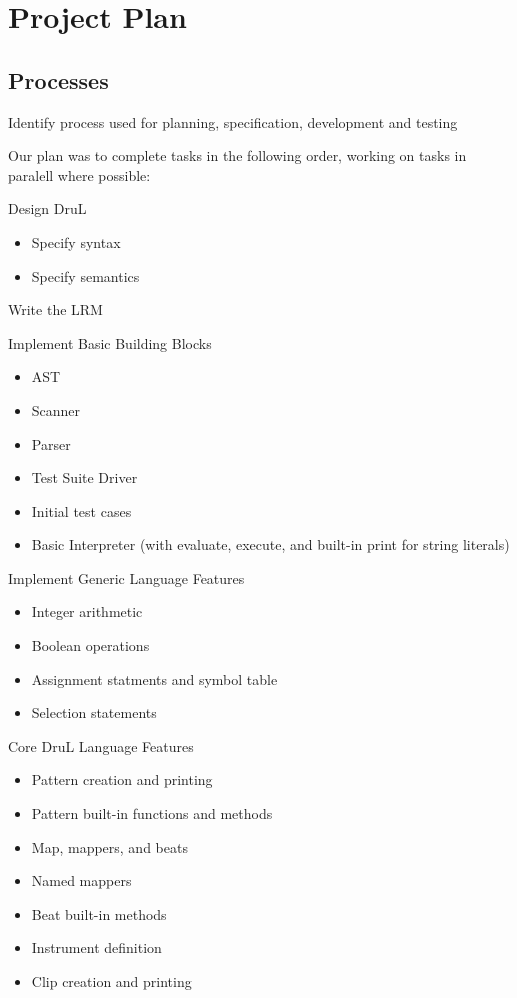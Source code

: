 \chapter{Project Plan}

\section{Processes}
Identify process used for planning, specification, development and testing

Our plan was to complete tasks in the following order, working on tasks in paralell where possible:

\begin{enumeration}

\item Design DruL
\begin{itemize}
	\item Specify syntax
	\item Specify semantics
\end{itemize}

\item Write the LRM

\item Implement Basic Building Blocks
\begin{itemize}
	\item AST
	\item Scanner
	\item Parser
	\item Test Suite Driver
	\item Initial test cases
	\item Basic Interpreter (with evaluate, execute, and built-in print for string literals)
\end{itemize}

\item Implement Generic Language Features
\begin{itemize}
	\item Integer arithmetic
	\item Boolean operations
	\item Assignment statments and symbol table
	\item Selection statements
\end{itemize}

\item Core DruL Language Features
\begin{itemize}
	\item Pattern creation and printing
	\item Pattern built-in functions and methods
	\item Map, mappers, and beats
	\item Named mappers
	\item Beat built-in methods
	\item Instrument definition
	\item Clip creation and printing
\end{itemize}


\end{enumeration}
